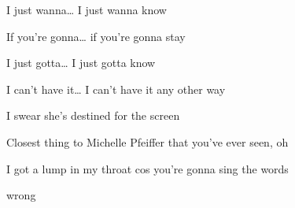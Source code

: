\begin{song}
\bigskip

\Chorus \par

\bigskip

I just wanna… I just wanna know  \par
{} If you're gonna… if you're gonna stay  \par
{} I just gotta… I just gotta know  \par
{}I can't have it… I can't have it any other way \par

\bigskip

 \par
I  swear she's destined for the screen \par
{}Closest thing to Michelle Pfeiffer that you've ever seen, oh \par

\bigskip


\Chorus {} \par

\bigskip

I got a lump in my throat cos you're gonna sing the words \par
{}wrong \par

\end{song}
